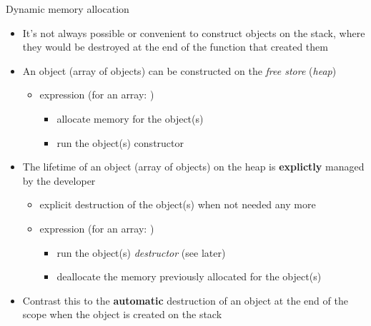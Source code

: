 \begin{frame}{Dynamic memory allocation}

  \begin{itemize}
  \item<1-> It's not always possible or convenient to construct objects on the
    stack, where they would be destroyed at the end of the function that created
    them
  \item<2-> An object (array of objects) can be constructed on the \textit{free
      store} (\textit{heap})
    \begin{itemize}
    \item {} expression (for an array: )
      \begin{itemize}
      \item allocate memory for the object(s)
      \item run the object(s) constructor
      \end{itemize}
    \end{itemize}
  \item<3-> The lifetime of an object (array of objects) on the heap is
    \textbf{explictly} managed by the developer
    \begin{itemize}
    \item explicit destruction of the object(s) when not needed any more
    \item {} expression (for an array: )
      \begin{itemize}
      \item run the object(s) \textit{destructor} (see later)
      \item deallocate the memory previously allocated for the object(s)
      \end{itemize}
    \end{itemize}
  \item<4-> Contrast this to the \textbf{automatic} destruction of an object at
    the end of the scope when the object is created on the stack
  \end{itemize}

\end{frame}

